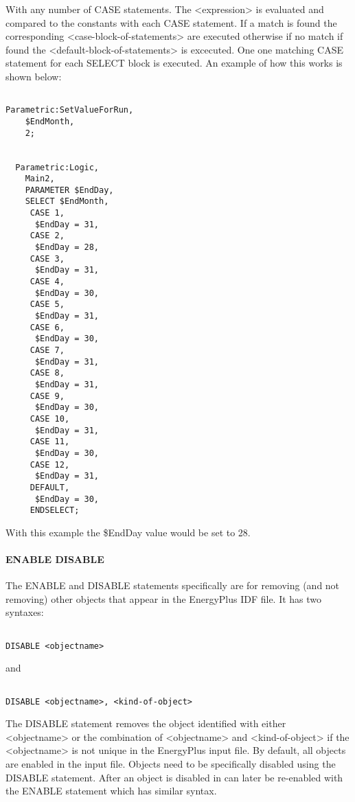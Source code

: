 With any number of CASE statements. The \textless{}expression\textgreater{} is evaluated and compared to the constants with each CASE statement. If a match is found the corresponding \textless{}case-block-of-statements\textgreater{} are executed otherwise if no match if found the \textless{}default-block-of-statements\textgreater{} is excecuted. One one matching CASE statement for each SELECT block is executed. An example of how this works is shown below:

\begin{lstlisting}

Parametric:SetValueForRun,
    $EndMonth,
    2;


  Parametric:Logic,
    Main2,
    PARAMETER $EndDay,
    SELECT $EndMonth,
     CASE 1,
      $EndDay = 31,
     CASE 2,
      $EndDay = 28,
     CASE 3,
      $EndDay = 31,
     CASE 4,
      $EndDay = 30,
     CASE 5,
      $EndDay = 31,
     CASE 6,
      $EndDay = 30,
     CASE 7,
      $EndDay = 31,
     CASE 8,
      $EndDay = 31,
     CASE 9,
      $EndDay = 30,
     CASE 10,
      $EndDay = 31,
     CASE 11,
      $EndDay = 30,
     CASE 12,
      $EndDay = 31,
     DEFAULT,
      $EndDay = 30,
     ENDSELECT;
\end{lstlisting}

With this example the \$EndDay value would be set to 28.

\paragraph{ENABLE DISABLE}\label{enable-disable}

The ENABLE and DISABLE statements specifically are for removing (and not removing) other objects that appear in the EnergyPlus IDF file. It has two syntaxes:

\begin{lstlisting}

DISABLE <objectname>
\end{lstlisting}

and

\begin{lstlisting}

DISABLE <objectname>, <kind-of-object>
\end{lstlisting}

The DISABLE statement removes the object identified with either \textless{}objectname\textgreater{} or the combination of \textless{}objectname\textgreater{} and \textless{}kind-of-object\textgreater{} if the \textless{}objectname\textgreater{} is not unique in the EnergyPlus input file. By default, all objects are enabled in the input file. Objects need to be specifically disabled using the DISABLE statement. After an object is disabled in can later be re-enabled with the ENABLE statement which has similar syntax.

